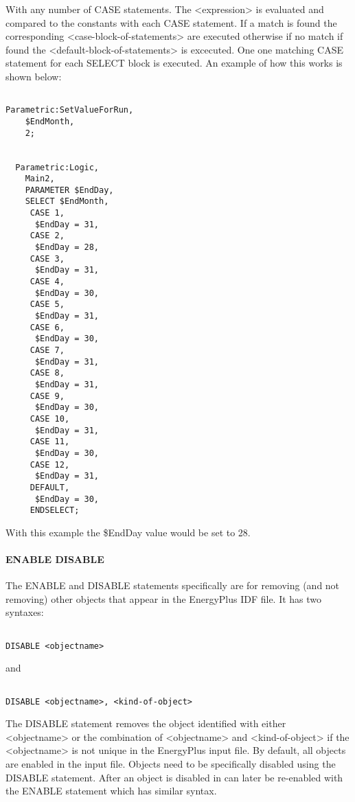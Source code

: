 With any number of CASE statements. The \textless{}expression\textgreater{} is evaluated and compared to the constants with each CASE statement. If a match is found the corresponding \textless{}case-block-of-statements\textgreater{} are executed otherwise if no match if found the \textless{}default-block-of-statements\textgreater{} is excecuted. One one matching CASE statement for each SELECT block is executed. An example of how this works is shown below:

\begin{lstlisting}

Parametric:SetValueForRun,
    $EndMonth,
    2;


  Parametric:Logic,
    Main2,
    PARAMETER $EndDay,
    SELECT $EndMonth,
     CASE 1,
      $EndDay = 31,
     CASE 2,
      $EndDay = 28,
     CASE 3,
      $EndDay = 31,
     CASE 4,
      $EndDay = 30,
     CASE 5,
      $EndDay = 31,
     CASE 6,
      $EndDay = 30,
     CASE 7,
      $EndDay = 31,
     CASE 8,
      $EndDay = 31,
     CASE 9,
      $EndDay = 30,
     CASE 10,
      $EndDay = 31,
     CASE 11,
      $EndDay = 30,
     CASE 12,
      $EndDay = 31,
     DEFAULT,
      $EndDay = 30,
     ENDSELECT;
\end{lstlisting}

With this example the \$EndDay value would be set to 28.

\paragraph{ENABLE DISABLE}\label{enable-disable}

The ENABLE and DISABLE statements specifically are for removing (and not removing) other objects that appear in the EnergyPlus IDF file. It has two syntaxes:

\begin{lstlisting}

DISABLE <objectname>
\end{lstlisting}

and

\begin{lstlisting}

DISABLE <objectname>, <kind-of-object>
\end{lstlisting}

The DISABLE statement removes the object identified with either \textless{}objectname\textgreater{} or the combination of \textless{}objectname\textgreater{} and \textless{}kind-of-object\textgreater{} if the \textless{}objectname\textgreater{} is not unique in the EnergyPlus input file. By default, all objects are enabled in the input file. Objects need to be specifically disabled using the DISABLE statement. After an object is disabled in can later be re-enabled with the ENABLE statement which has similar syntax.

